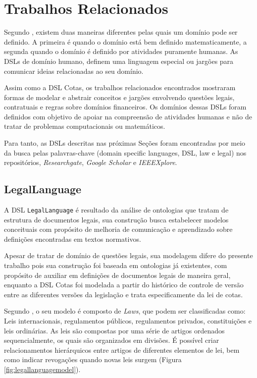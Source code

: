 \section{Trabalhos Relacionados}
\label{subsection:trabalhoscorrelatos}
 Segundo , existem duas maneiras diferentes pelas quais um domínio pode ser definido. A primeira é quando o domínio está bem definido matematicamente, a segunda quando o domínio é definido por atividades puramente humanas. As DSLs de domínio humano, definem uma linguagem especial ou jargões para comunicar ideias relacionadas ao seu domínio.  
 
 Assim como a DSL Cotas, os trabalhos relacionados encontrados mostraram formas de modelar e abstrair conceitos e jargões envolvendo questões legais, contratuais e regras sobre domínios financeiros. Os domínios dessas DSLs foram definidos com objetivo de apoiar na compreensão de atividades humanas e não de tratar de problemas computacionais ou matemáticos.
 
 Para tanto, as DSLs descritas nas próximas Seções foram encontradas por meio da busca pelas palavras-chave (domain specific languages, DSL, law e legal)  nos repositórios, \textit{Researchgate}, \textit{Google Scholar} e \textit{IEEEXplore}.
 
 
\subsection{LegalLanguage}
\label{legallanguage}

A DSL \texttt{LegalLanguage} é resultado da análise de ontologias que tratam de estrutura de documentos legais, sua construção busca estabelecer modelos conceituais com propósito de melhoria de comunicação e aprendizado sobre definições encontradas em textos normativos.

Apesar de tratar de domínio de questões legais, sua modelagem difere do presente trabalho pois sua construção foi baseada em ontologias já existentes, com propósito de auxiliar em definições de documentos legais de maneira geral, enquanto a DSL Cotas foi modelada a partir do histórico de controle de versão entre as diferentes versões da legislação e trata especificamente da lei de cotas. 



Segundo , o seu modelo é composto de \textit{Laws}, que podem ser classificadas como: Leis internacionais, regulamentos públicos, regulamentos privados, constituições e leis ordinárias. As leis são compostas por uma série de artigos ordenados sequencialmente, os quais são organizados em divisões. É possível criar relacionamentos hierárquicos entre artigos de diferentes elementos de lei, bem como indicar revogações quando novas leis surgem (Figura \ref{fig:legallanguagemodel}). 

